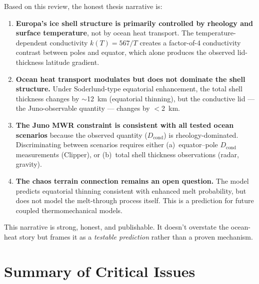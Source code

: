 \documentclass[11pt,a4paper]{article}
\begin{document}
Based on this review, the honest thesis narrative is:

\begin{enumerate}[leftmargin=2em]
\item \textbf{Europa's ice shell structure is primarily controlled by
      rheology and surface temperature}, not by ocean heat transport.
      The temperature-dependent conductivity $k(T) = 567/T$ creates a
      factor-of-4 conductivity contrast between poles and equator, which
      alone produces the observed lid-thickness latitude gradient.

\item \textbf{Ocean heat transport modulates but does not dominate the
      shell structure.} Under Soderlund-type equatorial enhancement, the
      total shell thickness changes by $\sim$12~km (equatorial thinning),
      but the conductive lid --- the Juno-observable quantity --- changes
      by $<$2~km.

\item \textbf{The Juno MWR constraint is consistent with all tested
      ocean scenarios} because the observed quantity ($D_\mathrm{cond}$)
      is rheology-dominated. Discriminating between scenarios requires
      either (a)~equator--pole $D_\mathrm{cond}$ measurements (Clipper),
      or (b)~total shell thickness observations (radar, gravity).

\item \textbf{The chaos terrain connection remains an open question.}
      The model predicts equatorial thinning consistent with enhanced
      melt probability, but does not model the melt-through process itself.
      This is a prediction for future coupled thermomechanical models.
\end{enumerate}

This narrative is strong, honest, and publishable. It doesn't overstate the
ocean-heat story but frames it as a \textit{testable prediction} rather than
a proven mechanism.

\section{Summary of Critical Issues}
\end{document}
